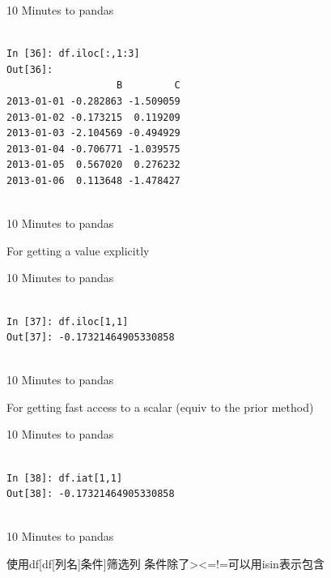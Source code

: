 \documentclass{beamer}
\begin{document}
\begin{frame}[t,fragile]{10 Minutes to pandas}


	\scriptsize
\begin{verbatim}

In [36]: df.iloc[:,1:3]
Out[36]: 
                   B         C
2013-01-01 -0.282863 -1.509059
2013-01-02 -0.173215  0.119209
2013-01-03 -2.104569 -0.494929
2013-01-04 -0.706771 -1.039575
2013-01-05  0.567020  0.276232
2013-01-06  0.113648 -1.478427


\end{verbatim}


\end{frame}


\begin{frame}[t]{10 Minutes to pandas}

For getting a value explicitly

\end{frame}


\begin{frame}[t,fragile]{10 Minutes to pandas}


	\scriptsize
\begin{verbatim}

In [37]: df.iloc[1,1]
Out[37]: -0.17321464905330858


\end{verbatim}


\end{frame}


\begin{frame}[t]{10 Minutes to pandas}

For getting fast access to a scalar (equiv to the prior method)

\end{frame}


\begin{frame}[t,fragile]{10 Minutes to pandas}


	\scriptsize
\begin{verbatim}

In [38]: df.iat[1,1]
Out[38]: -0.17321464905330858


\end{verbatim}


\end{frame}


\begin{frame}[t]{10 Minutes to pandas}

使用df[df[列名]条件]筛选列
条件除了><=!=可以用isin表示包含


\end{frame}
\end{document}
